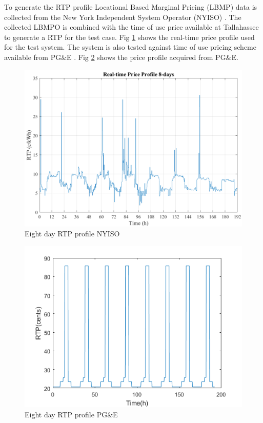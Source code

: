 To generate the RTP profile Locational Based Marginal Pricing (LBMP) data is collected from the New York Independent System Operator (NYISO) \cite{NYISO2017}. The collected LBMPO is combined with the time of use price available at Tallahassee to generate a RTP for the test case. Fig \ref{fig:RTP_PROFILE_8} shows the real-time price profile used for the test system. The system is also tested against time of use pricing scheme available from PG\&E \cite{pgne}. Fig \ref{fig:PGNE_PRICE} shows the price profile acquired from PG\&E.

\begin{figure}[!ht]
    \centering
    \includegraphics[width = \linewidth]{figs/rtp_8days.png}
    \caption{Eight day RTP profile NYISO}
    \label{fig:RTP_PROFILE_8}
\end{figure}

\begin{figure}[!ht]
    \centering
    \includegraphics[width = \linewidth]{figs/PGNE_PRICE.png}
    \caption{Eight day RTP profile PG\&E}
    \label{fig:PGNE_PRICE}
\end{figure}

